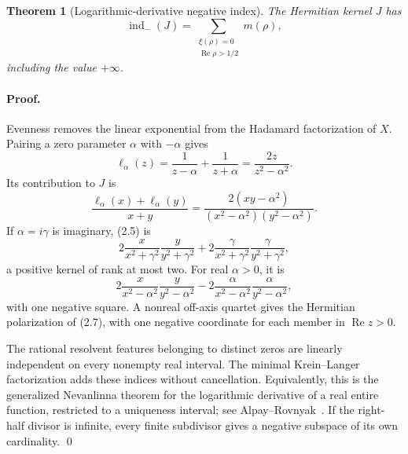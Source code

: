\documentclass[11pt]{article}
\newtheorem{theorem}{Theorem}[section]
\theoremstyle{definition}
\theoremstyle{remark}
\newcommand{\indm}{\operatorname{ind}_{-}}
\newcommand{\Rea}{\operatorname{Re}}
\begin{document}
\begin{theorem}[Logarithmic-derivative negative index]
\label{thm:Jindex}
The Hermitian kernel $J$ has
\begin{equation}
 \indm(J)
 =\sum_{\substack{\xi(\rho)=0\\ \Rea\rho>1/2}}m(\rho),      \tag{2.3}
\end{equation}
including the value $+\infty$.
\end{theorem}

\paragraph{Proof.}
Evenness removes the linear exponential from the Hadamard factorization of $X$.  Pairing a zero
parameter $\alpha$ with $-\alpha$ gives
\begin{equation}
 \ell_\alpha(z)=\frac1{z-\alpha}+\frac1{z+\alpha}
 =\frac{2z}{z^2-\alpha^2}.                                 \tag{2.4}
\end{equation}
Its contribution to $J$ is
\begin{equation}
 \frac{\ell_\alpha(x)+\ell_\alpha(y)}{x+y}
 =\frac{2(xy-\alpha^2)}
 {(x^2-\alpha^2)(y^2-\alpha^2)}.                           \tag{2.5}
\end{equation}
If $\alpha=i\gamma$ is imaginary, (2.5) is
\begin{equation}
 2\frac{x}{x^2+\gamma^2}\frac{y}{y^2+\gamma^2}
 +2\frac{\gamma}{x^2+\gamma^2}
       \frac{\gamma}{y^2+\gamma^2},                        \tag{2.6}
\end{equation}
a positive kernel of rank at most two.  For real $\alpha>0$, it is
\begin{equation}
 2\frac{x}{x^2-\alpha^2}\frac{y}{y^2-\alpha^2}
 -2\frac{\alpha}{x^2-\alpha^2}
       \frac{\alpha}{y^2-\alpha^2},                        \tag{2.7}
\end{equation}
with one negative square.  A nonreal off-axis quartet gives the Hermitian polarization of
(2.7), with one negative coordinate for each member in $\Rea z>0$.

The rational resolvent features belonging to distinct zeros are linearly independent on every
nonempty real interval.  The minimal Krein--Langer factorization adds these indices without
cancellation.  Equivalently, this is the generalized Nevanlinna theorem for the logarithmic
derivative of a real entire function, restricted to a uniqueness interval; see
Alpay--Rovnyak~\cite{AlpayRovnyak1999}.  If the right-half divisor is infinite, every finite
subdivisor gives a negative subspace of its own cardinality. \qed
\end{document}
